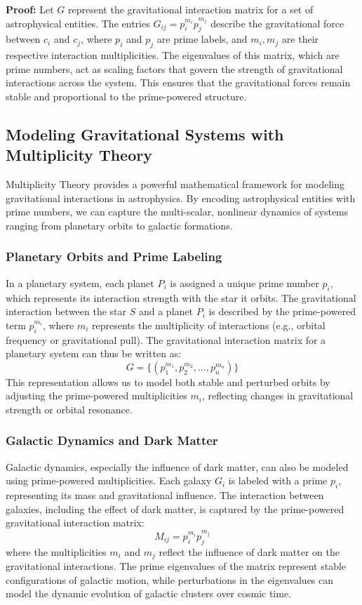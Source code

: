 \documentclass[%
 preprint, linenumbers,
 amsmath,amssymb,
 aps, physrev,
]{revtex4-2}
\begin{document}
\textbf{Proof:} Let \( G \) represent the gravitational interaction matrix for a set of astrophysical entities. The entries \( G_{ij} = p_i^{m_i} p_j^{m_j} \) describe the gravitational force between \( c_i \) and \( c_j \), where \( p_i \) and \( p_j \) are prime labels, and \( m_i, m_j \) are their respective interaction multiplicities. The eigenvalues of this matrix, which are prime numbers, act as scaling factors that govern the strength of gravitational interactions across the system. This ensures that the gravitational forces remain stable and proportional to the prime-powered structure.

\subsection{Modeling Gravitational Systems with Multiplicity Theory}
Multiplicity Theory provides a powerful mathematical framework for modeling gravitational interactions in astrophysics. By encoding astrophysical entities with prime numbers, we can capture the multi-scalar, nonlinear dynamics of systems ranging from planetary orbits to galactic formations.

\subsubsection{Planetary Orbits and Prime Labeling}
In a planetary system, each planet \( P_i \) is assigned a unique prime number \( p_i \), which represents its interaction strength with the star it orbits. The gravitational interaction between the star \( S \) and a planet \( P_i \) is described by the prime-powered term \( p_i^{m_i} \), where \( m_i \) represents the multiplicity of interactions (e.g., orbital frequency or gravitational pull). The gravitational interaction matrix for a planetary system can thus be written as:
\[
G = \{(p_1^{m_1}, p_2^{m_2}, \dots, p_n^{m_n})\}
\]
This representation allows us to model both stable and perturbed orbits by adjusting the prime-powered multiplicities \( m_i \), reflecting changes in gravitational strength or orbital resonance.

\subsubsection{Galactic Dynamics and Dark Matter}
Galactic dynamics, especially the influence of dark matter, can also be modeled using prime-powered multiplicities. Each galaxy \( G_i \) is labeled with a prime \( p_i \), representing its mass and gravitational influence. The interaction between galaxies, including the effect of dark matter, is captured by the prime-powered gravitational interaction matrix:
\[
M_{ij} = p_i^{m_i} p_j^{m_j}
\]
where the multiplicities \( m_i \) and \( m_j \) reflect the influence of dark matter on the gravitational interactions. The prime eigenvalues of the matrix represent stable configurations of galactic motion, while perturbations in the eigenvalues can model the dynamic evolution of galactic clusters over cosmic time.
\end{document}
